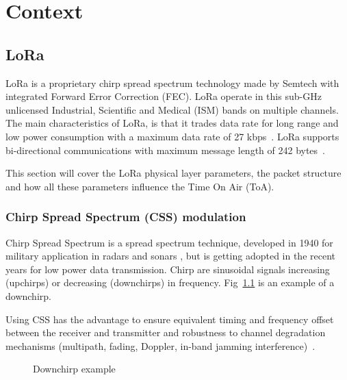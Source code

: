 \chapter{Context}


\section{LoRa\label{section:lora}}

LoRa is a proprietary chirp spread spectrum technology made by Semtech with
integrated Forward Error Correction (FEC).
LoRa operate in this sub-GHz unlicensed Industrial, Scientific and Medical
(ISM) bands on multiple channels.
The main characteristics of LoRa, is that it trades data rate for long range 
and low power consumption with a maximum data rate of 27 kbps~\cite{8030482}.
LoRa supports bi-directional communications with maximum message length of 242
bytes~\cite{loraalliance:lorawanspecification}.

This section will cover the LoRa physical layer parameters, the packet structure and how
all these parameters influence the Time On Air (ToA).

\subsection{Chirp Spread Spectrum (CSS) modulation}

Chirp Spread Spectrum is a spread spectrum technique, developed in 1940 for
military application in radars and sonars \cite{semtech:modulationbasics}, but is 
getting adopted in the recent years for low power data transmission.
Chirp are sinusoidal signals increasing (upchirps) or decreasing (downchirps)
in frequency.
Fig~\ref{fig:downchirp} is an example of a downchirp.

Using CSS has the advantage to ensure equivalent timing and frequency offset
between the receiver and transmitter and robustness to channel degradation
mechanisms (multipath, fading, Doppler, in-band jamming
interference)~\cite{semtech:modulationbasics}.


\begin{figure}[H]
\centering
{} 
\caption{Downchirp example\label{fig:downchirp}}
\end{figure}

